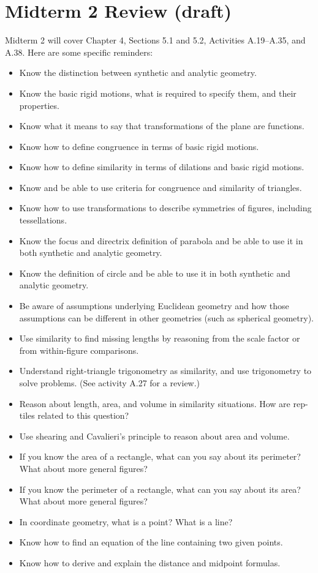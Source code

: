 \newpage

\section{Midterm 2 Review (draft)}

Midterm 2 will cover Chapter 4, Sections 5.1 and 5.2, Activities A.19--A.35, and A.38. Here are some specific reminders:  
\begin{itemize}\itemsep-3pt
\item Know the distinction between synthetic and analytic geometry.
\item Know the basic rigid motions, what is required to specify them, and their properties. 
\item Know what it means to say that transformations of the plane are functions.  
\item Know how to define congruence in terms of basic rigid motions. 
\item Know how to define similarity in terms of dilations and basic rigid motions.  
\item Know and be able to use criteria for congruence and similarity of triangles.  
\item Know how to use transformations  to describe symmetries of figures, including tessellations.  
\item Know the focus and directrix definition of parabola and be able to use it in both synthetic and analytic geometry.
\item Know the definition of circle and be able to use it in both synthetic and analytic geometry.
\item Be aware of assumptions underlying Euclidean geometry and how those assumptions can be different in other geometries (such as spherical geometry).  
\item Use similarity to find missing lengths by reasoning from the scale factor or from within-figure comparisons.   
\item Understand right-triangle trigonometry as similarity, and use trigonometry to solve problems.  (See activity A.27 for a review.)
\item Reason about length, area, and volume in similarity situations.  How are rep-tiles related to this question?  
\item Use shearing and Cavalieri's principle to reason about area and volume.  
\item If you know the area of a rectangle, what can you say about its perimeter?  What about more general figures?  
\item If you know the perimeter of a rectangle, what can you say about its area?  What about more general figures? 
\item In coordinate geometry, what is a point?  What is a line?  
\item Know how to find an equation of the line containing two given points.  
\item Know how to derive and explain the distance and midpoint formulas. 
\end{itemize}



